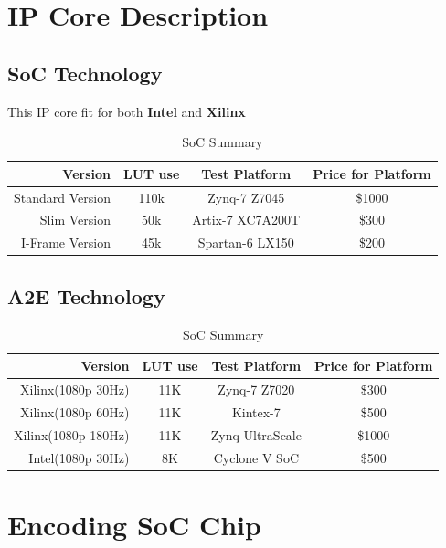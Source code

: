 \documentclass[12pt,article]{memoir}
\begin{document}
\section{IP Core Description}
\subsection{SoC Technology}
This IP core fit for both \textbf{Intel} and \textbf{Xilinx}
\begin{table}[H]
	\centering
		\begin{tabu}{r || c | c | c }
		Version & LUT use & Test Platform & Price for Platform\\ \hline
		Standard Version & 110k & Zynq-7 Z7045 & \$1000\\
		Slim Version & 50k & Artix-7 XC7A200T & \$300\\
		I-Frame Version & 45k & Spartan-6 LX150 & \$200\\
		\end{tabu}
	\caption{SoC Summary}
	\label{tab:socs}
\end{table}
\subsection{A2E Technology}
\begin{table}[H]
	\centering
		\begin{tabu}{r || c | c | c }
		Version & LUT use & Test Platform & Price for Platform\\ \hline
		Xilinx(1080p 30Hz) & 11K & Zynq-7 Z7020 & \$300\\
		Xilinx(1080p 60Hz) & 11K & Kintex-7 & \$500\\
		Xilinx(1080p 180Hz) & 11K & Zynq UltraScale & \$1000\\\hline
		Intel(1080p 30Hz) & 8K & Cyclone V SoC & \$500\\
		\end{tabu}
	\caption{SoC Summary}
	\label{tab:socs}
\end{table}
\newpage
\section{Encoding SoC Chip}
\end{document}
